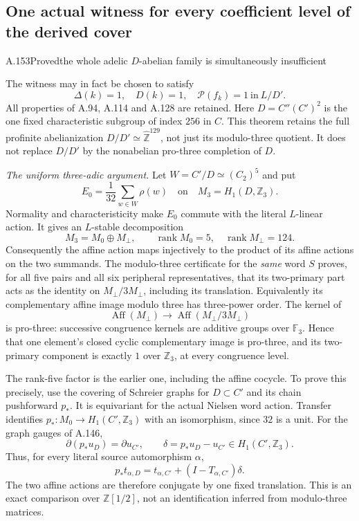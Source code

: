 \subsection{One actual witness for every coefficient level of the derived cover}


\begin{statement}{A.153}{Proved}{the whole adelic $D$-abelian family is simultaneously insufficient}
\end{statement}
The witness may in fact be chosen to satisfy
\[
 \boxed{\quad \Delta(k)=1,\quad D(k)=1,\quad
       \mathcal P(f_k)=1\ \text{in}\ L/D'.\quad}
\]
All properties of A.94, A.114 and A.128 are retained.
Here $D=C''(C')^2$ is the one fixed characteristic
subgroup of index $256$ in $C$.  This theorem retains
the full profinite abelianization
$D/D'\simeq\widehat{\mathbb Z}^{129}$, not just its
modulo-three quotient.  It does not replace $D/D'$ by
the nonabelian pro-three completion of $D$.

\emph{The uniform three-adic argument.}
Let $W=C'/D\simeq(C_2)^5$ and put
\[
 E_0=\frac1{32}\sum_{w\in W}\rho(w)
 \quad\text{on}\quad M_3=H_1(D,\mathbb Z_3).
\]
Normality and characteristicity make $E_0$ commute
with the literal $L$-linear action.  It gives an
$L$-stable decomposition
\[
 M_3=M_0\oplus M_\perp,
 \qquad \operatorname{rank}M_0=5,
 \quad\operatorname{rank}M_\perp=124.
\]
Consequently the affine action maps injectively to
the product of its affine actions on the two summands.
The modulo-three certificate for the \emph{same} word
$S$ proves, for all five pairs and all six peripheral
representatives, that its two-primary part acts as the
identity on $M_\perp/3M_\perp$, including its translation.
Equivalently its complementary affine image modulo three
has three-power order.  The kernel of
\[
 \operatorname{Aff}(M_\perp)\longrightarrow
 \operatorname{Aff}(M_\perp/3M_\perp)
\]
is pro-three: successive congruence kernels are additive
groups over $\mathbb F_3$.  Hence that one element's
closed cyclic complementary image is pro-three, and
its two-primary component is exactly $1$ over
$\mathbb Z_3$, at every congruence level.

The rank-five factor is the earlier one, including the
affine cocycle.  To prove this precisely, use the
covering of Schreier graphs for $D\subset C'$ and its
chain pushforward $p_*$.  It is equivariant for the
actual Nielsen word action.  Transfer identifies
$p_*:M_0\to H_1(C',\mathbb Z_3)$ with an isomorphism,
since $32$ is a unit.  For the graph gauges of A.146,
\[
 \partial(p_*u_D)=\partial u_{C'},\qquad
 \delta=p_*u_D-u_{C'}\in H_1(C',\mathbb Z_3).
\]
Thus, for every literal source automorphism $\alpha$,
\[
 p_*t_{\alpha,D}
   =t_{\alpha,C'}+(I-T_{\alpha,C'})\delta.
\]
The two affine actions are therefore conjugate by one
fixed translation.  This is an exact comparison over
$\mathbb Z[1/2]$, not an identification inferred from
modulo-three matrices.

